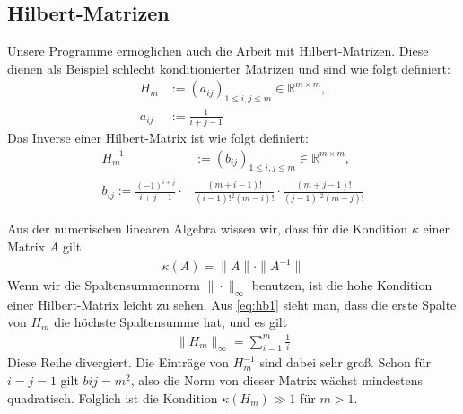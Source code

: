 \documentclass[smallheadings]{scrartcl}
\numberwithin{equation}{section}
\begin{document}
\subsection{Hilbert-Matrizen}
Unsere Programme ermöglichen auch die Arbeit mit Hilbert-Matrizen. Diese dienen als Beispiel schlecht konditionierter Matrizen und sind wie folgt definiert:
\begin{align}
H_m &:= (a_{ij})_{1\le i, j \le m} \in \mathbb{R}^{m\times m}, 	\\
a_{ij} &:= \frac{1}{i+j-1} \label{eq:hb1}
\end{align}
Das Inverse einer Hilbert-Matrix ist wie folgt definiert:
\begin{align}
H_m^{-1}& := (b_{ij})_{1\le i, j \le m} \in \mathbb{R}^{m\times m},	\\
b_{ij} := \frac{(-1)^{i+j}}{i+j-1}\cdot &\frac{(m+i-1)!}{(i-1)!^2(m-i)!}\cdot \frac{(m+j-1)!}{(j-1)!^2(m-j)!}
\end{align}

Aus der numerischen linearen Algebra wissen wir, dass für die Kondition $\kappa$ einer Matrix $A$ gilt
\begin{align}
\kappa(A)=\|A\|\cdot \|A^{-1}\|
\end{align}
Wenn wir die Spaltensummennorm $\|\cdot \|_{\infty}$ benutzen, ist die hohe Kondition einer Hilbert-Matrix leicht zu sehen. Aus \ref{eq:hb1}  sieht man, dass die erste Spalte von $H_m$ die höchste Spaltensumme hat, und es gilt
\begin{align}
\|H_m\|_{\infty}=\sum_{i=1}^{m}\frac{1}{i}
\end{align}
Diese Reihe divergiert. Die Einträge von $H_m^{-1}$ sind dabei sehr groß. Schon für $i=j=1$ gilt $bij = m^2$, also die Norm von dieser Matrix wächst mindestens quadratisch. Folglich ist die Kondition $\kappa(H_m)\gg1$ für $m>1$.

\end{document}

